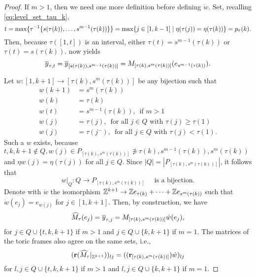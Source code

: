 \begin{proof}
	If $m > 1$, then we need one more definition before defining $\dot{w}$. Set, recalling
	\cref{eq:level_set_tau_k},
	\begin{equation*}
		t = \max\{\tau^{-1}\{s(\tau(k)), \dots, s^{m-1}(\tau(k))\}\} = \max \{j \in [1, k-1] \mid \eta(\tau(j)) = \eta(\tau(k))\} = p_\tau(k).
	\end{equation*}
	Then, because $\tau([1, t])$ is an interval, either $\tau(t) = s^{m-1}(\tau(k))$ or
	$\tau(t) = s(\tau(k))$.  now yields
	\begin{equation*}
		\overline{y}_{\tau, t} = \overline{y}_{[s(\tau(k)), s^{m-1}(\tau(k))]} = M_{[\tau(k), s^m(\tau(k))]}(e_{s^{m-1}(\tau(k))}).
	\end{equation*}

	Let $w \colon [1, k+1] \to [\tau(k), s^m(\tau(k))]$ be any bijection such that
	\begin{align*}
		w(k+1) & = s^m(\tau(k))                                                            \\
		w(k)   & = \tau(k)                                                                 \\
		w(t)   & = s^{m-1}(\tau(k)),\,\text{ if }m >1                                      \\
		w(j)   & = \tau(j), \,\text{ for all }j \in Q \text{ with } \tau(j) \geq \tau(1)   \\
		w(j)   & = \tau(j^{-}), \,\text{ for all }j \in Q \text{ with } \tau(j) < \tau(1).
	\end{align*}
	Such a $w$ exists, because $t,k,k+1 \notin Q, w(j) \in P_{[\tau(k), s^m(\tau(k))]}
		\not\ni \tau(k), s^{m-1}(\tau(k)), s^m(\tau(k))$ and $\eta w(j) = \eta(\tau(j))$ for
	all $j \in Q$. Since $|Q| = |P_{[\tau(k), s^m(\tau(k))]}|$, it follows that
	\begin{equation}\label{eq:w_is_bijection}
		w|_Q \colon Q \to P_{[\tau(k), s^m(\tau(k))]}\quad \text{ is a bijection.}
	\end{equation}
	Denote with $\dot{w}$ the isomorphism $\mathbb{Z}^{k+1} \to \mathbb{Z} e_{\tau(k)} + \cdots + \mathbb{Z}
		e_{s^m(\tau(k))}$ such that $\dot{w}(e_j) = e_{w(j)}$ for $j\in[1, k+1]$. Then, by
	construction, we have
	\begin{equation*}
		\widehat{M}_\tau(e_j) = \overline{y}_{\tau, j} = M_{[\tau(k), s^m(\tau(k))]}\dot{w}(e_j),
	\end{equation*}
	for $j\in Q \cup \{t, k, k+1\}$ if $m>1$ and $j \in Q \cup \{k, k+1\}$ if $m=1$. The
	matrices of the toric frames also agree on the same sets, i.e.,
	\begin{equation*}
		(\mathbf{r}(\widehat{M}_\tau |_{\mathbb{Z}^{k+1}}))_{lj} = ((\mathbf{r}_{[\tau(k), s^m(\tau(k))]})\dot{w})_{lj}
	\end{equation*}
	for $l,j \in Q \cup \{t, k, k+1\}$ if $m>1$ and $l, j \in Q \cup \{k, k+1\}$ if $m=1$.


\end{proof}
